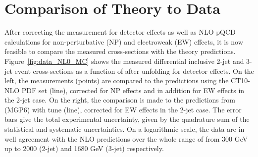\section{Comparison of Theory to Data}
After correcting the measurement for detector effects as well as NLO pQCD calculations for non-perturbative (NP) and electroweak (EW) effects, it is now feasible to compare the measured cross-sections with the theory predictions. Figure~\ref{fig:data_NL0_MC} shows the measured differential inclusive 2-jet and 3-jet event cross-sections as a function of \httwo after unfolding for detector effects. On the left, the measurements (points) are compared to the \NLOJETPP predictions using the CT10-NLO PDF set (line), corrected for NP effects and in addition for EW effects in the 2-jet case. On the right, the comparison is made to the predictions from \MadGraphFn \plusn \PYTHIAS (MG\plusn P6) with tune \Ztwostar (line), corrected for EW effects in the 2-jet case. The error bars give the total experimental uncertainty, given by the quadrature sum of the statistical and systematic uncertainties. On a logarithmic scale, the data are in well agreement with the NLO predictions over the whole range of \httwo from 300 GeV up to 2000 (2-jet) and 1680 GeV (3-jet) respectively. 


